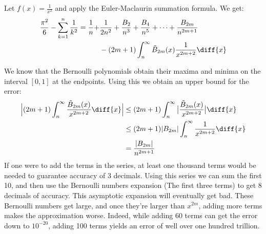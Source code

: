 \documentclass[crop=false,class=book,oneside]{standalone}
\begin{document}
        \begin{lexample}
            Let $f(x)=\frac{1}{x^{2}}$ and apply the Euler-Maclaurin
            summation formula. We get:
            \begin{equation}
                \begin{split}
                    \frac{\pi^{2}}{6}-\sum_{k=1}^{n}\frac{1}{k^{2}}
                    =\frac{1}{n}+
                        &\frac{1}{2n^{2}}+\frac{B_{2}}{n^{3}}+
                        \frac{B_{4}}{n^{5}}+\cdots+
                        \frac{B_{2m}}{n^{2m+1}}\\
                        &-(2m+1)\int_{n}^{\infty}
                            \tilde{B}_{2m}(x)\frac{1}{x^{2m+2}}\diff{x}
                \end{split}
            \end{equation}
        \end{lexample}
        We know that the Bernoulli polynomials obtain their maxima and
        minima on the interval $[0,1]$ at the endpoints. Using this
        we obtain an upper bound for the error:
        \begin{align}
            \Big|(2m+1)\int_{n}^{\infty}
                \frac{\tilde{B}_{2m}(x)}{x^{2m+2}}\diff{x}\Big|
                &\leq(2m+1)\int_{n}^{\infty}
                    \big|\frac{\tilde{B}_{2m}(x)}{x^{2m+2}}\big|\diff{x}\\
                &\leq(2m+1)|B_{2m}|\int_{n}^{\infty}
                    \frac{1}{x^{2m+2}}\diff{x}\\
                &=\frac{|B_{2m}|}{n^{2m+1}}
        \end{align}
        If one were to add the terms in the series, at least one thousand
        terms would be needed to guarantee accuracy of 3 decimals. Using this
        series we can sum the first 10, and then use the Bernoulli numbers
        expansion (The first three terms) to get 8 decimals of accuracy.
        This asymptotic expansion will eventually get bad. These Bernoulli
        numbers get large, and once they're larger than $x^{2m}$, adding
        more terms makes the approximation worse. Indeed, while adding
        60 terms can get the error down to $10^{-20}$, adding 100 terms yields
        an error of well over one hundred trillion.
\end{document}
